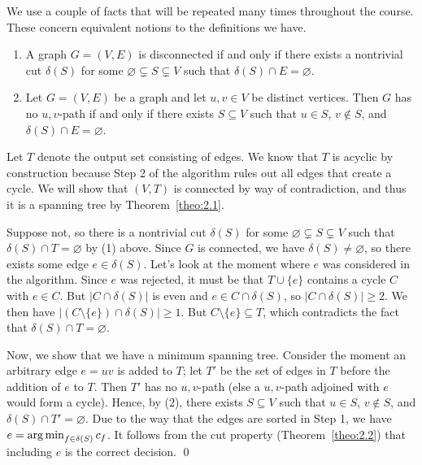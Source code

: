 We use a couple of facts that will be repeated 
many times throughout the course. These concern equivalent 
notions to the definitions we have.
\begin{enumerate}[(1)]
    \item A graph $G = (V, E)$ is disconnected if and only if there exists a 
    nontrivial cut $\delta(S)$ for some $\varnothing \subsetneq S \subsetneq V$ such that 
    $\delta(S) \cap E = \varnothing$. 
    \item Let $G = (V, E)$ be a graph and let $u, v \in V$ be distinct vertices. 
    Then $G$ has no $u, v$-path if and only if there exists $S \subseteq V$ 
    such that $u \in S$, $v \notin S$, and $\delta(S) \cap E = \varnothing$. 
\end{enumerate}
\begin{pf}
    Let $T$ denote the output set consisting of edges. We know that $T$ is 
    acyclic by construction because Step 2 of the algorithm rules 
    out all edges that create a cycle. We will show that $(V, T)$ is 
    connected by way of contradiction, and thus it is a spanning tree 
    by Theorem~\ref{theo:2.1}.

    Suppose not, so there is a nontrivial cut $\delta(S)$ for some $\varnothing \subsetneq S 
    \subsetneq V$ such that $\delta(S) \cap T = \varnothing$ by (1) above. 
    Since $G$ is connected, we have $\delta(S) \neq \varnothing$, so 
    there exists some edge $e \in \delta(S)$. 
    Let's look at the moment where $e$ was considered in the algorithm. 
    Since $e$ was rejected, it must be that $T \cup \{e\}$ contains a cycle 
    $C$ with $e \in C$. But $|C \cap \delta(S)|$ is even and $e \in 
    C \cap \delta(S)$, so $|C \cap \delta(S)| \geq 2$. We then have 
    $|(C \setminus \{e\}) \cap \delta(S)| \geq 1$. But $C \setminus \{e\} 
    \subseteq T$, which contradicts the fact that $\delta(S) \cap T = \varnothing$. 

    Now, we show that we have a minimum spanning tree. Consider the moment 
    an arbitrary edge $e = uv$ is added to $T$; let $T'$ be the set of edges 
    in $T$ before the addition of $e$ to $T$. Then $T'$ has no $u, v$-path 
    (else a $u, v$-path adjoined with $e$ would form a cycle). Hence, 
    by (2), there exists $S \subseteq V$ such that $u \in S$, $v \notin S$, 
    and $\delta(S) \cap T' = \varnothing$. Due to the way that the edges 
    are sorted in Step 1, we have $e = \operatorname*{arg\,min}_{f\in\delta(S)} c_f$. 
    It follows from the cut property (Theorem~\ref{theo:2.2}) that including 
    $e$ is the correct decision. \qed
\end{pf}\vspace{-0.25cm}

